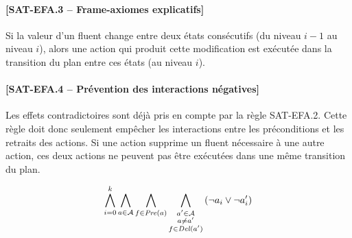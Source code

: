 \paragraph*{[SAT-EFA.3 -- Frame-axiomes explicatifs]} %
Si la valeur d'un fluent change entre deux états consécutifs (du niveau $i-1$ au niveau $i$), alors une action qui produit cette modification est exécutée dans la transition du plan entre ces états (au niveau $i$).
\paragraph*{[SAT-EFA.4 -- Prévention des interactions négatives]}%
Les effets contradictoires sont déjà pris en compte par la règle SAT-EFA.2.
Cette règle doit donc seulement empêcher les interactions entre les préconditions et les retraits des actions. Si une action supprime un fluent nécessaire à une autre action, ces deux actions ne peuvent pas être exécutées dans une même transition du plan.

\[ \bigwedge\limits_{\substack{i=0}}^{k} \bigwedge\limits_{\substack{a \in \mathcal{A}}} \bigwedge\limits_{\substack{f\in \mathit{Pre}(a)}} \bigwedge\limits_{\substack{a' \in \mathcal{A} \\ a \neq a' \\ f \in \mathit{Del}(a')}}\left(\neg a_{i} \vee \neg a'_{i}\right) \]

